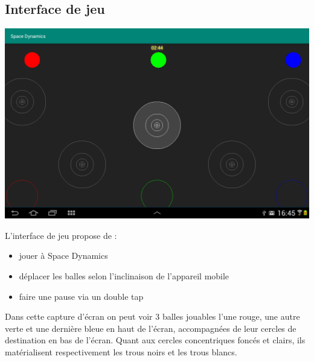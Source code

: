 \documentclass{article}
\begin{document}
\subsection{Interface de jeu}
\begin{center}
\includegraphics[scale=0.25]{PlayGameActivity.png}
\end{center}
L'interface de jeu propose de :
\begin{itemize}
\item jouer à Space Dynamics
\item déplacer les balles selon l’inclinaison de l’appareil mobile
\item faire une pause via un double tap
\end{itemize}
Dans cette capture d’écran on peut voir 3 balles jouables l’une rouge, une autre verte et une dernière bleue en haut de l’écran, accompagnées de leur cercles de destination en bas de l'écran. Quant aux cercles concentriques foncés et clairs, ils matérialisent respectivement les trous noirs et les trous blancs.
\end{document}
